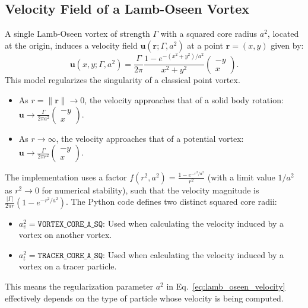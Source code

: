 \documentclass[12pt,letterpaper]{article}
\newcommand{\vel}{\bm{u}}
\newcommand{\vortstrength}{\Gamma}
\newcommand{\corevsq}{a_v^2}
\newcommand{\coretsq}{a_t^2}
\begin{document}
\subsection{Velocity Field of a Lamb-Oseen Vortex}
A single Lamb-Oseen vortex of strength $\vortstrength$ with a squared core radius $a^2$, located at the origin, induces a velocity field $\vel(\bm{r}; \vortstrength, a^2)$ at a point $\bm{r}=(x,y)$ given by:
\begin{equation}
    \vel(x,y; \vortstrength, a^2) = \frac{\vortstrength}{2\pi} \frac{1 - e^{-(x^2+y^2)/a^2}}{x^2+y^2} \begin{pmatrix} -y \\ x \end{pmatrix}.
    \label{eq:lamb_oseen_velocity}
\end{equation}
This model regularizes the singularity of a classical point vortex.
\begin{itemize}
    \item As $r = \|\bm{r}\| \to 0$, the velocity approaches that of a solid body rotation: $\vel \to \frac{\vortstrength}{2\pi a^2} \begin{pmatrix} -y \\ x \end{pmatrix}$.
    \item As $r \to \infty$, the velocity approaches that of a potential vortex: $\vel \to \frac{\vortstrength}{2\pi r^2} \begin{pmatrix} -y \\ x \end{pmatrix}$.
\end{itemize}
The implementation uses a factor $f(r^2, a^2) = \frac{1 - e^{-r^2/a^2}}{r^2}$ (with a limit value $1/a^2$ as $r^2 \to 0$ for numerical stability), such that the velocity magnitude is $\frac{|\vortstrength|}{2\pi r} (1 - e^{-r^2/a^2})$.
The Python code defines two distinct squared core radii:
\begin{itemize}
    \item $\corevsq = \texttt{VORTEX\_CORE\_A\_SQ}$: Used when calculating the velocity induced by a vortex on another vortex.
    \item $\coretsq = \texttt{TRACER\_CORE\_A\_SQ}$: Used when calculating the velocity induced by a vortex on a tracer particle.
\end{itemize}
This means the regularization parameter $a^2$ in Eq.~\eqref{eq:lamb_oseen_velocity} effectively depends on the type of particle whose velocity is being computed.
\end{document}
